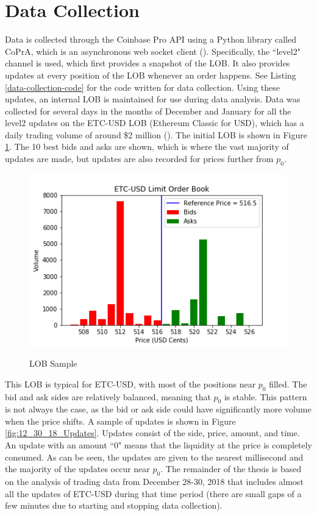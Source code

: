 \section{Data Collection}
Data is collected through the Coinbase Pro API using a Python library called CoPrA, which is an asynchronous web socket client (\cite{L3}). Specifically, the ``level2" channel is used, which first provides a snapshot of the LOB. It also provides updates at every position of the LOB whenever an order happens. See Listing \ref{data-collection-code} for the code written for data collection. Using these updates, an internal LOB is maintained for use during data analysis. Data was collected for several days in the months of December and January for all the level2 updates on the ETC-USD LOB (Ethereum Classic for USD), which has a daily trading volume of around \$2 million (\cite{L1}). The initial LOB is shown in Figure \ref{fig:12_30_18_LOB_pic}. The 10 best bids and asks are shown, which is where the vast majority of updates are made, but updates are also recorded for prices further from $p_0$.

\begin{figure}[t]
\begin{center}
\caption{LOB Sample}
\includegraphics[width=\textwidth]{Figures/12_30_18_LOB.png}
\label{fig:12_30_18_LOB_pic}
\end{center}
\end{figure}

This LOB is typical for ETC-USD, with most of the positions near $p_0$ filled. The bid and ask sides are relatively balanced, meaning that $p_0$ is stable. This pattern is not always the case, as the bid or ask side could have significantly more volume when the price shifts. A sample of updates is shown in Figure \ref{fig:12_30_18_Updates}. Updates consist of the side, price, amount, and time. An update with an amount ``0" means that the liquidity at the price is completely consumed. As can be seen, the updates are given to the nearest millisecond and the majority of the updates occur near $p_0$. The remainder of the thesis is based on the analysis of trading data from December 28-30, 2018 that includes almost all the updates of ETC-USD during that time period (there are small gaps of a few minutes due to starting and stopping data collection).

